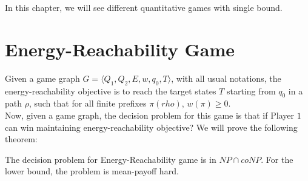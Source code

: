 In this chapter, we will see different quantitative games with single bound. \\

\section{Energy-Reachability Game}
Given a game graph $G=\langle Q_1, Q_2, E, w, q_0, T \rangle$, with all usual notations, the energy-reachability objective is to reach the target states $T$ starting from $q_0$ in a path $\rho$, such that for all finite prefixes $\pi(rho)$, $w(\pi) \geq 0$.\\

Now, given a game graph, the decision problem for this game is that if Player $1$ can win maintaining energy-reachability objective? We will prove the following theorem:\\
\begin{theorem}
The decision problem for Energy-Reachability game is in $NP \cap coNP$. For the lower bound, the problem is mean-payoff hard.
\end{theorem}
